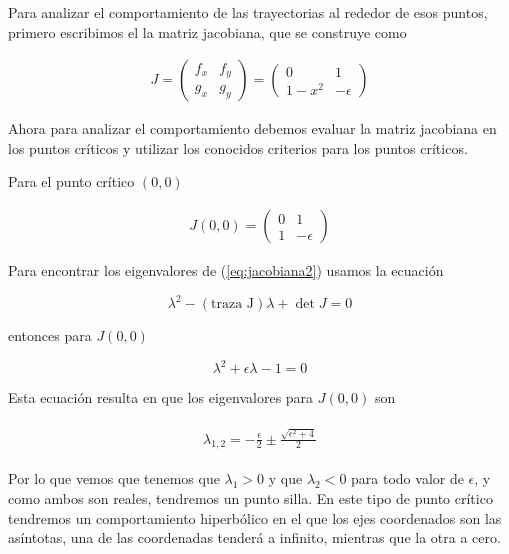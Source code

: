 \documentclass[a4paper,10pt]{article}
\begin{document}
Para analizar el comportamiento de las trayectorias al rededor de esos puntos, primero escribimos 
el la matriz jacobiana, que se construye como


\begin{align}
J = \begin{pmatrix}
     f_x & f_y \\
     g_x & g_y
\end{pmatrix} = \begin{pmatrix}
		0 & 1 \\
		1- x^2 & -\epsilon
		\end{pmatrix}
\label{eq:jacobiana1}
\end{align}

Ahora para analizar el comportamiento debemos evaluar la matriz jacobiana en los puntos
críticos y utilizar los conocidos criterios para los puntos críticos.

Para el punto crítico $(0,0)$

\begin{align}
J(0,0) = \begin{pmatrix}
     0 & 1 \\
     1 & -\epsilon
\end{pmatrix}
\label{eq:jacobiana2}
\end{align}

Para encontrar los eigenvalores de (\ref{eq:jacobiana2}) usamos la ecuación

\begin{equation}
 \lambda^2 - (\text{traza J}) \lambda + \det{J} = 0
 \label{eq:calcEigenvalores}
\end{equation}

entonces para $J(0,0)$

\begin{equation}
 \lambda^2 + \epsilon \lambda - 1 = 0
\end{equation}

Esta ecuación resulta en que los eigenvalores para $J(0,0)$ son

\begin{align}
 \begin{split}
  \lambda_{1,2} = - \frac{\epsilon}{2} \pm \frac{\sqrt{\epsilon^2 + 4}}{2}
 \end{split}
\end{align}

Por lo que vemos que tenemos que $\lambda_1 > 0$ y que $\lambda_2 < 0$ para todo valor
de $\epsilon$, y como ambos son reales, tendremos un punto silla. En este tipo de punto
crítico tendremos un comportamiento hiperbólico en el que los ejes coordenados son 
las asíntotas, una de las coordenadas tenderá a infinito, mientras que la otra a cero.
\end{document}
